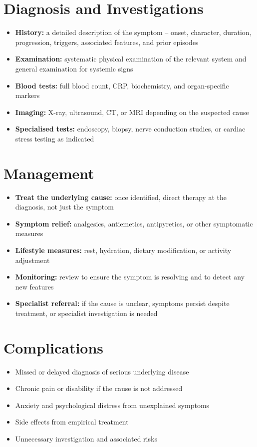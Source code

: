\section*{Diagnosis and Investigations}
\begin{itemize}
    \item \textbf{History:} a detailed description of the symptom -- onset, character, duration, progression, triggers, associated features, and prior episodes
    \item \textbf{Examination:} systematic physical examination of the relevant system and general examination for systemic signs
    \item \textbf{Blood tests:} full blood count, CRP, biochemistry, and organ-specific markers
    \item \textbf{Imaging:} X-ray, ultrasound, CT, or MRI depending on the suspected cause
    \item \textbf{Specialised tests:} endoscopy, biopsy, nerve conduction studies, or cardiac stress testing as indicated
\end{itemize}

\section*{Management}
\begin{itemize}
    \item \textbf{Treat the underlying cause:} once identified, direct therapy at the diagnosis, not just the symptom
    \item \textbf{Symptom relief:} analgesics, antiemetics, antipyretics, or other symptomatic measures
    \item \textbf{Lifestyle measures:} rest, hydration, dietary modification, or activity adjustment
    \item \textbf{Monitoring:} review to ensure the symptom is resolving and to detect any new features
    \item \textbf{Specialist referral:} if the cause is unclear, symptoms persist despite treatment, or specialist investigation is needed
\end{itemize}

\section*{Complications}
\begin{itemize}
    \item Missed or delayed diagnosis of serious underlying disease
    \item Chronic pain or disability if the cause is not addressed
    \item Anxiety and psychological distress from unexplained symptoms
    \item Side effects from empirical treatment
    \item Unnecessary investigation and associated risks
\end{itemize}

